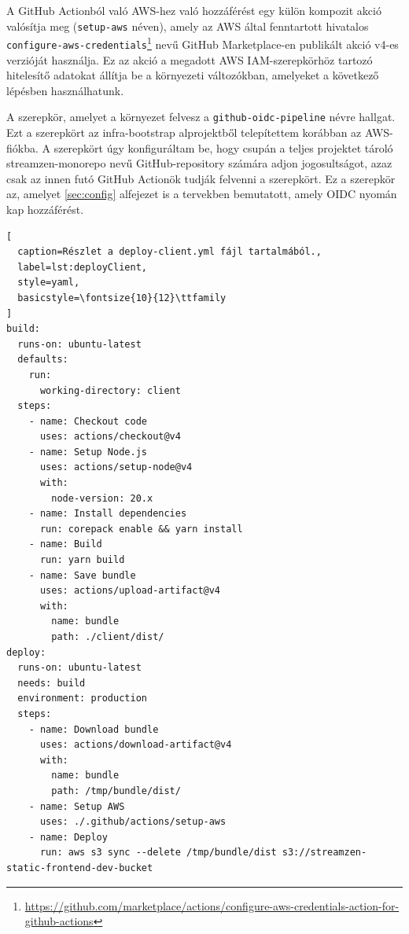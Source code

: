 A GitHub Actionból való AWS-hez való hozzáférést egy külön kompozit akció valósítja meg (\verb|setup-aws| néven), amely az AWS által fenntartott hivatalos \verb|configure-aws-credentials|\footnote{\url{https://github.com/marketplace/actions/configure-aws-credentials-action-for-github-actions}} nevű GitHub Marketplace-en publikált akció v4-es verzióját használja. Ez az akció a megadott AWS IAM-szerepkörhöz tartozó hitelesítő adatokat állítja be a környezeti változókban, amelyeket a következő lépésben használhatunk.

A szerepkör, amelyet a környezet felvesz a \verb|github-oidc-pipeline| névre hallgat. Ezt a szerepkört az infra-bootstrap alprojektből telepítettem korábban az AWS-fiókba. A szerepkört úgy konfiguráltam be, hogy csupán a teljes projektet tároló streamzen-monorepo nevű GitHub-repository számára adjon jogosultságot, azaz csak az innen futó GitHub Actionök tudják felvenni a szerepkört. Ez a szerepkör az, amelyet \ref{sec:config} alfejezet is a tervekben bemutatott, amely OIDC nyomán kap hozzáférést.

\begin{minipage}{0.92\textwidth}
  \begin{lstlisting}[
  caption=Részlet a deploy-client.yml fájl tartalmából.,
  label=lst:deployClient,
  style=yaml,
  basicstyle=\fontsize{10}{12}\ttfamily
]
build:
  runs-on: ubuntu-latest
  defaults:
    run:
      working-directory: client
  steps:
    - name: Checkout code
      uses: actions/checkout@v4
    - name: Setup Node.js
      uses: actions/setup-node@v4
      with:
        node-version: 20.x
    - name: Install dependencies
      run: corepack enable && yarn install
    - name: Build
      run: yarn build
    - name: Save bundle
      uses: actions/upload-artifact@v4
      with:
        name: bundle
        path: ./client/dist/
deploy:
  runs-on: ubuntu-latest
  needs: build
  environment: production
  steps:
    - name: Download bundle
      uses: actions/download-artifact@v4
      with:
        name: bundle
        path: /tmp/bundle/dist/
    - name: Setup AWS
      uses: ./.github/actions/setup-aws
    - name: Deploy
      run: aws s3 sync --delete /tmp/bundle/dist s3://streamzen-static-frontend-dev-bucket
\end{lstlisting}
\end{minipage}
